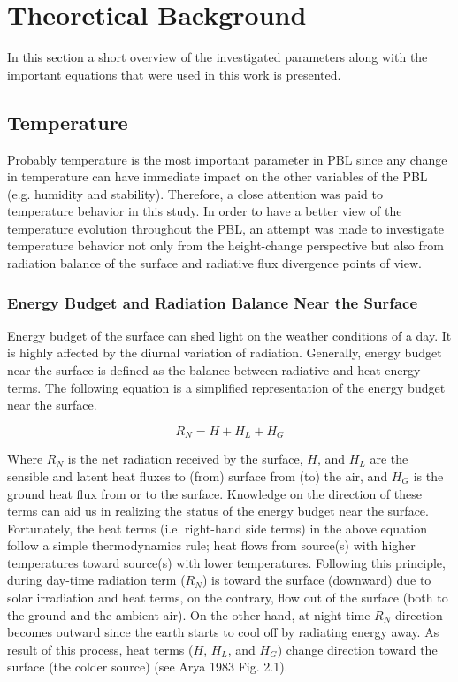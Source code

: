 \documentclass[a4paper,12pt]{article}
\numberwithin{equation}{section} %
\begin{document}
\newpage

\section{Theoretical Background}

In this section a short overview of the investigated parameters along with the important equations that were used in this work is presented.

\subsection{Temperature}

Probably temperature is the most important parameter in PBL since any change in temperature can have immediate impact on the other variables of the PBL (e.g. humidity and stability). Therefore, a close attention was paid to temperature behavior in this study. In order to have a better view of the temperature evolution throughout the PBL, an attempt was made to investigate temperature behavior not only from the height-change perspective but also from radiation balance of the surface and radiative flux divergence points of view. 

\subsubsection{Energy Budget and Radiation Balance Near the Surface}

Energy budget of the surface can shed light on the weather conditions of a day. It is highly affected by the diurnal variation of radiation. Generally, energy budget near the surface is defined as the balance between radiative and heat energy terms. The following equation is a simplified representation of the energy budget near the surface.

\vspace{0.25cm}
\begin{equation}\label{eq:budget}
R_N = H + H_L + H_G
\end{equation}
\vspace{0.25cm}

Where $R_N$ is the net radiation received by the surface, $H$, and $H_L$ are the sensible and latent heat fluxes to (from) surface from (to) the air, and $H_G$ is the ground heat flux from or to the surface. Knowledge on the direction of these terms can aid us in realizing the status of the energy budget near the surface. Fortunately, the heat terms (i.e. right-hand side terms) in the above equation follow a simple thermodynamics rule; heat flows from source(s) with higher temperatures toward source(s) with lower temperatures. Following this principle, during day-time radiation term ($R_N$) is toward the surface (downward) due to solar irradiation and heat terms, on the contrary, flow out of the surface (both to the ground and the ambient air). On the other hand, at night-time $R_N$ direction becomes outward since the earth starts to cool off by radiating energy away. As result of this process, heat terms ($H$, $H_L$, and $H_G$) change direction toward the surface (the colder source) (see Arya 1983 Fig. 2.1).
\end{document}
